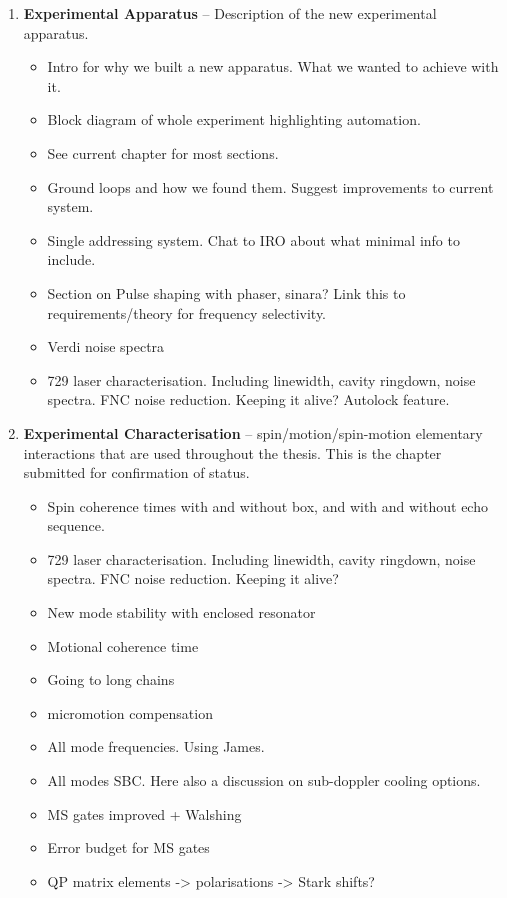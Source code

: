 \begin{enumerate}
    \item \textbf{Experimental Apparatus} 
    -- Description of the new experimental apparatus. 
    \begin{itemize}
        \item Intro for why we built a new apparatus. What we wanted to achieve with it. 
        \item Block diagram of whole experiment highlighting automation.
        \item See current chapter for most sections.
        \item Ground loops and how we found them. Suggest improvements to current system.
        \item Single addressing system. Chat to IRO about what minimal info to include.
        \item Section on Pulse shaping with phaser, sinara? Link this to requirements/theory for frequency selectivity.
        \item Verdi noise spectra
        \item 729 laser characterisation. Including linewidth, cavity ringdown, noise spectra. FNC noise reduction. Keeping it alive? Autolock feature.
    \end{itemize}

    \item \textbf{Experimental Characterisation} 
    -- spin/motion/spin-motion elementary interactions that are used throughout the thesis. This is the chapter submitted for confirmation of status.\\
    \begin{itemize}
        \item Spin coherence times with and without box, and with and without echo sequence.
        \item 729 laser characterisation. Including linewidth, cavity ringdown, noise spectra. FNC noise reduction. Keeping it alive?
        \item New mode stability with enclosed resonator
        \item Motional coherence time
        \item Going to long chains
        \item micromotion compensation
        \item All mode frequencies. Using James.
        \item All modes SBC. Here also a discussion on sub-doppler cooling options.
        \item MS gates improved + Walshing
        \item Error budget for MS gates
        \item QP matrix elements -> polarisations -> Stark shifts?
    \end{itemize}



\end{enumerate}
